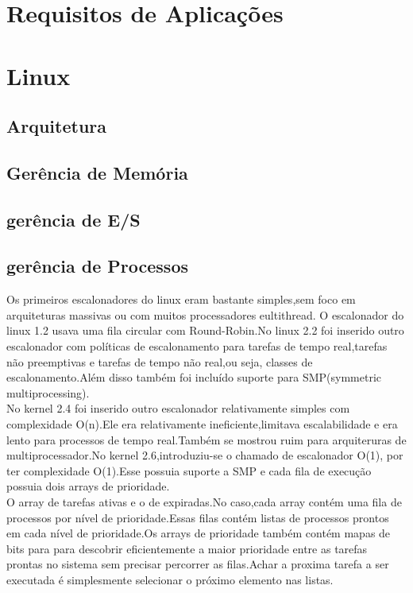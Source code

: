 \documentclass[conference]{IEEEtran}
\begin{document}
\section{Requisitos de Aplicações}\label{sec:req}

\section{Linux}\label{sec:linux}

\subsection{Arquitetura}\label{sec:LinuxArq}

\subsection{Gerência de Memória}\label{sec:LinuxMem}

\subsection{gerência de E/S}\label{sec:LinuxES}

\subsection{gerência de Processos}\label{sec:LinuxPROC}

Os primeiros escalonadores do linux eram bastante simples,sem foco em arquiteturas massivas ou com muitos processadores eultithread. O escalonador do linux 1.2 usava uma fila circular com Round-Robin.No linux 2.2 foi inserido outro escalonador com políticas de escalonamento para tarefas de tempo real,tarefas não preemptivas e tarefas de tempo não real,ou seja, classes de escalonamento.Além disso também foi incluído suporte para SMP(symmetric multiprocessing)\cite{LinuxSchedulerIBM}.\\

 No kernel 2.4 foi  inserido outro escalonador relativamente simples com complexidade O(n).Ele era relativamente ineficiente,limitava escalabilidade e era lento para processos de tempo real.Também se mostrou ruim para arquiteruras de multiprocessador.No kernel 2.6,introduziu-se o chamado de escalonador O(1), por ter complexidade O(1).Esse possuia suporte a SMP e cada fila de execução possuia dois arrays de prioridade.\\

 O array de tarefas ativas e o de expiradas.No caso,cada array contém uma fila de processos por nível de prioridade.Essas filas contém listas de processos prontos em cada nível de prioridade.Os  arrays de prioridade também contém mapas de bits para para descobrir eficientemente a maior prioridade entre as tarefas prontas no sistema sem precisar percorrer as filas.Achar a proxima tarefa a ser executada é simplesmente selecionar o próximo elemento nas listas.\\
\end{document}
